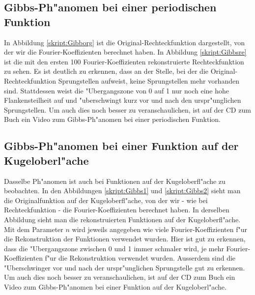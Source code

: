\begin{refsection}
\subsection{Gibbs-Ph"anomen bei einer periodischen Funktion}
In Abbildung \ref{skript:Gibborg} ist die Original-Rechteckfunktion 
dargestellt, von der wir die Fourier-Koeffizienten berechnet haben. 
In Abbildung \ref{skript:Gibbsre} ist die mit den ersten 100 
Fourier-Koeffizienten rekonstruierte Rechteckfunktion zu sehen. 
Es ist deutlich zu erkennen, dass an der Stelle, bei der die 
Original-Rechteckfunktion Sprungstellen aufweist, keine Sprungstellen 
mehr vorhanden sind. 
Stattdessen weist die "Ubergangszone von 0 auf 1 nur noch eine hohe 
Flankensteilheit auf und "uberschwingt kurz vor und nach den 
urspr"unglichen Sprungstellen.
Um auch dies noch besser zu veranschaulichen, ist auf der CD zum Buch 
ein Video zum Gibbs-Ph"anomen bei einer periodischen Funktion.

\subsection{Gibbs-Ph"anomen bei einer Funktion auf der Kugeloberl"ache}
Dasselbe Ph"anomen ist auch bei Funktionen auf der Kugeloberfl"ache 
zu beobachten. 
In den Abbildungen \ref{skript:Gibbs1} und \ref{skript:Gibbs2} sieht 
man die Originalfunktion auf der Kugeloberfl"ache, von der wir - 
wie bei Rechteckfunktion - die Fourier-Koeffizienten berechnet haben. 
In derselben Abbildung sieht man die rekonstruierten Funktionen auf 
der Kugeloberfl"ache. 
Mit dem Parameter $n$ wird jeweils angegeben wie viele 
Fourier-Koeffizienten f"ur die Rekonstruktion der Funktionen 
verwendet wurden. 
Hier ist gut zu erkennen, dass die "Ubergangszone zwischen 0 und 1 
immer schmaler wird, je mehr Fourier-Koeffizienten f"ur die 
Rekonstruktion verwendet wurden. 
Ausserdem sind die "Uberschwinger vor und nach der urspr"unglichen 
Sprungstelle gut zu erkennen.
Um auch dies noch besser zu veranschaulichen, ist auf der CD zum Buch 
ein Video zum Gibbs-Ph"anomen bei einer Funktion auf der Kugeloberl"ache.


\end{refsection}
